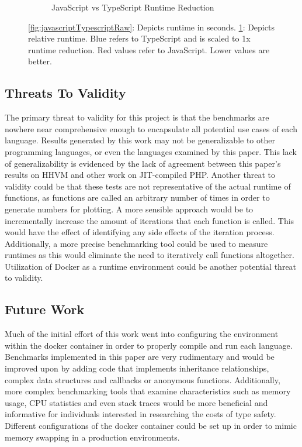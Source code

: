\begin{figure}[H]
\begin{subfigure}{.5\textwidth}
  \caption{JavaScript vs TypeScript Runtime Reduction}
  \label{fig:javascriptTypescriptRelative}
\end{subfigure}
\caption{\ref{fig:javascriptTypescriptRaw}: Depicts runtime in seconds. \ref{fig:javascriptTypescriptRelative}: Depicts relative runtime. Blue refers to TypeScript  and is scaled to 1x runtime reduction. Red values refer to JavaScript. Lower values are better.}
\label{fig:javascriptTypescript}
\end{figure}


\subsection{Threats To Validity}
The primary threat to validity for this project is that the benchmarks are nowhere near comprehensive enough to encapsulate all potential use cases of each language. Results generated by this work may not be generalizable to other programming languages, or even the languages examined by this paper. This lack of generalizability is evidenced by the lack of agreement between this paper's results on HHVM and other work on JIT-compiled PHP.
Another threat to validity could be that these tests are not representative of the actual runtime of functions, as functions are called an arbitrary number of times in order to generate numbers for plotting. A more sensible approach would be to incrementally increase the amount of iterations that each function is called. This would have the effect of identifying any side effects of the iteration process. Additionally, a more precise benchmarking tool could be used to measure runtimes as this would eliminate the need to iteratively call functions altogether.
Utilization of Docker as a runtime environment could be another potential threat to validity. 


\subsection{Future Work}
Much of the initial effort of this work went into configuring the environment within the docker container in order to properly compile and run each language. Benchmarks implemented in this paper are very rudimentary and would be improved upon by adding code that implements inheritance relationships, complex data structures and callbacks or anonymous functions. Additionally, more complex benchmarking tools that examine characteristics such as memory usage, CPU statistics and even stack traces would be more beneficial and informative for individuals interested in researching the costs of type safety. Different configurations of the docker container could be set up in order to mimic memory swapping in a production environments. 


